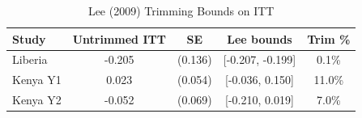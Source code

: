 \begin{table}[htbp]
\centering\small
\caption{Lee (2009) Trimming Bounds on ITT}
\label{tab:lee_bounds}
\begin{tabular}{lcccc}
\toprule
Study & Untrimmed ITT & SE & Lee bounds & Trim \% \\
\midrule
Liberia & -0.205 & (0.136) & [-0.207, -0.199] & 0.1\% \\
Kenya Y1 & 0.023 & (0.054) & [-0.036, 0.150] & 11.0\% \\
Kenya Y2 & -0.052 & (0.069) & [-0.210, 0.019] & 7.0\% \\
\bottomrule
\end{tabular}
\par\smallskip{}
\end{table}